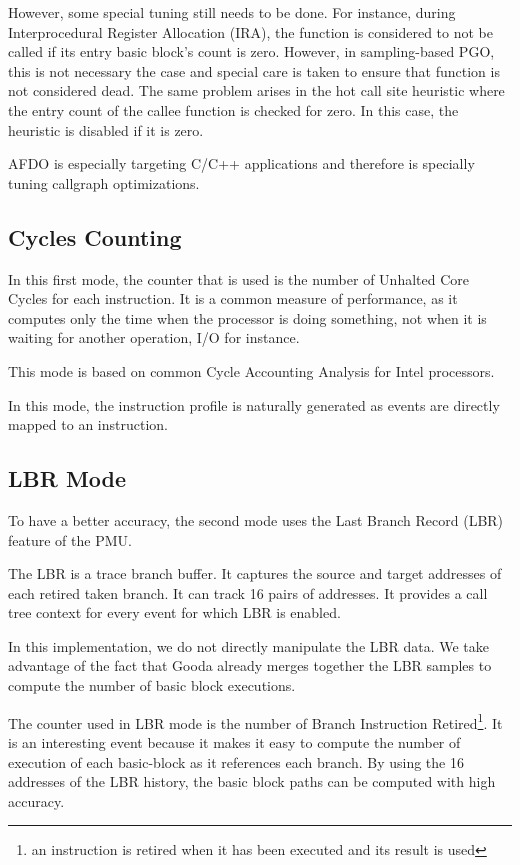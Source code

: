 \documentclass[9pt,english,twocolumn,letter]{article}
\begin{document}
However, some special tuning still needs to be done. For instance, during Interprocedural Register Allocation (IRA), the function is considered to not be called if its entry basic block's count is zero. However, in sampling-based PGO, this is not necessary the case and special care is taken to ensure that function is not considered dead. The same problem arises in the hot call site heuristic where the entry count of the callee function is checked for zero. In this case, the heuristic is disabled if it is zero.

AFDO is especially targeting C/C++ applications and therefore is specially tuning callgraph optimizations.

\subsection{Cycles Counting}
\label{seg:cycles-mode}

In this first mode, the counter that is used is the number of Unhalted Core Cycles for each instruction. It is a common measure of performance, as it computes only the time when the processor is doing something, not when it is waiting for another operation, I/O for instance.

This mode is based on common Cycle Accounting Analysis for Intel processors\cite{Levinthal2008}.

In this mode, the instruction profile is naturally generated as events are directly mapped to an instruction.

\subsection{LBR Mode}
\label{seg:lbr-mode}

To have a better accuracy, the second mode uses the Last Branch Record (LBR) feature of the PMU.

The LBR is a trace branch buffer. It captures the source and target addresses of each retired taken branch. It can track 16 pairs of addresses. It provides a call tree context for every event for which LBR is enabled.

In this implementation, we do not directly manipulate the LBR data. We take advantage of the fact that Gooda already merges together the LBR samples to compute the number of basic block executions.

The counter used in LBR mode is the number of Branch Instruction Retired\footnote{an instruction is retired when it has been executed and its result is used}. It is an interesting event because it makes it easy to compute the number of execution of each basic-block as it references each branch. By using the 16 addresses of the LBR history, the basic block paths can be computed with high accuracy.
\end{document}
